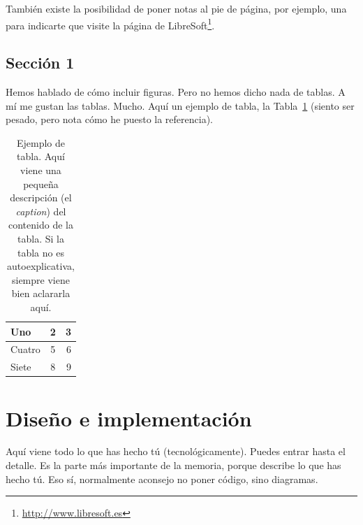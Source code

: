 \documentclass[a4paper, 12pt]{book}
\begin{document}
También existe la posibilidad de poner notas al pie de página, por ejemplo, una para indicarte que visite la página de LibreSoft\footnote{\url{http://www.libresoft.es}}.



\section{Sección 1} 
\label{sec:seccion1}

Hemos hablado de cómo incluir figuras.
Pero no hemos dicho nada de tablas.
A mí me gustan las tablas.
Mucho.
Aquí un ejemplo de tabla, la Tabla~\ref{tabla:ejemplo} (siento ser pesado, pero nota cómo he puesto la referencia).

\begin{table}
 \begin{center}
  \begin{tabular}{ | l | c | r |} %
    \hline
    Uno & 2 & 3 \\ \hline %
    Cuatro & 5 & 6 \\ \hline
    Siete & 8 & 9 \\
    \hline
  \end{tabular}
  \label{tabla:ejemplo}
  \caption{Ejemplo de tabla. Aquí viene una pequeña descripción (el \emph{caption}) del contenido de la tabla. Si la tabla no es autoexplicativa, siempre viene bien aclararla aquí.}
 \end{center}
\end{table}




\cleardoublepage
\chapter{Diseño e implementación}

Aquí viene todo lo que has hecho tú (tecnológicamente). 
Puedes entrar hasta el detalle. 
Es la parte más importante de la memoria, porque describe lo que has hecho tú.
Eso sí, normalmente aconsejo no poner código, sino diagramas.
\end{document}
